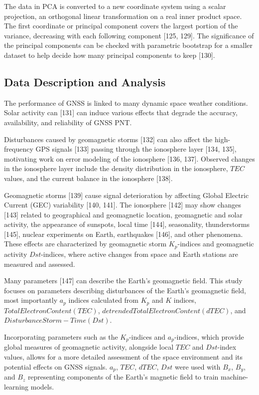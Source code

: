\documentclass[sn-mathphys-num]{sn-jnl}%
\begin{document}
The data in PCA is converted to a new coordinate system using a scalar projection, an orthogonal linear transformation on a real inner product space. The first coordinate or principal component covers the largest portion of the variance, decreasing with each following component [125, 129]. The significance of the principal components can be checked with parametric bootstrap for a smaller dataset to help decide how many principal components to keep [130].

\subsection{Data Description and Analysis}

The performance of GNSS is linked to many dynamic space weather conditions. Solar activity can [131] can induce various effects that degrade the accuracy, availability, and reliability of GNSS PNT.

Disturbances caused by geomagnetic storms [132] can also affect the high-frequency GPS signals [133] passing through the ionosphere layer [134, 135], motivating work on error modeling of the ionosphere [136, 137]. Observed changes in the ionosphere layer include the density distribution in the ionosphere, $TEC$ values, and the current balance in the ionosphere [138].

Geomagnetic storms [139] cause signal deterioration by affecting Global Electric Current (GEC) variability [140, 141]. The ionosphere [142] may show changes [143] related to geographical and geomagnetic location, geomagnetic and solar activity, the appearance of sunspots, local time [144], seasonality, thunderstorms [145], nuclear experiments on Earth, earthquakes [146], and other phenomena. These effects are characterized by geomagnetic storm $K_{p}$-indices and geomagnetic activity $Dst$-indices, where active changes from space and Earth stations are measured and assessed.

Many parameters [147] can describe the Earth's geomagnetic field. This study focuses on parameters describing disturbances of the Earth's geomagnetic field, most importantly $a_{p}$ indices calculated from $K_{p}$ and $K$ indices, $Total Electron Content (TEC)$, $detrended Total Electron Content (dTEC)$, and $Disturbance Storm-Time (Dst)$. 

Incorporating parameters such as the $K_{p}$-indices and $a_{p}$-indices, which provide global measures of geomagnetic activity, alongside local $TEC$ and $Dst$-index values, allows for a more detailed assessment of the space environment and its potential effects on GNSS signals. $a_{p}$, $TEC$, $dTEC$, $Dst$ were used with $B_x$, $B_y$, and $B_z$ representing components of the Earth's magnetic field to train machine-learning models.
\end{document}
